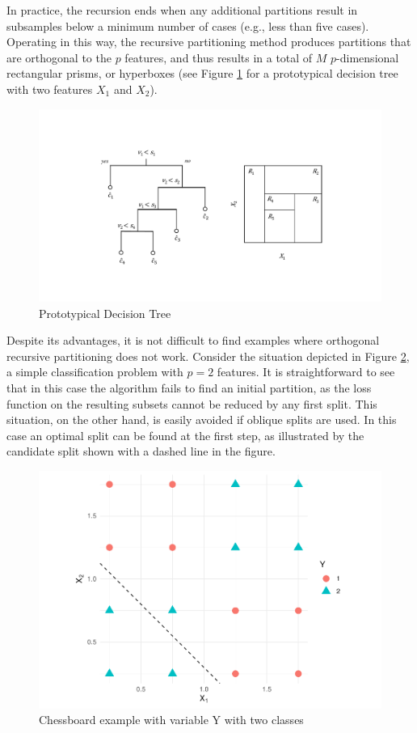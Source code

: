\documentclass[]{elsarticle} %
\makeatletter
\def\maxwidth{\ifdim\Gin@nat@width>\linewidth\linewidth
\else\Gin@nat@width\fi}
\let\Oldincludegraphics\includegraphics
\renewcommand{\includegraphics}[1]{\Oldincludegraphics[width=\maxwidth]{#1}}
\makeatother
\begin{document}
In practice, the recursion ends when any additional partitions result in
subsamples below a minimum number of cases (e.g., less than five cases).
Operating in this way, the recursive partitioning method produces
partitions that are orthogonal to the \(p\) features, and thus results
in a total of \(M\) \(p\)-dimensional rectangular prisms, or hyperboxes
(see Figure \ref{fig:fig1-example} for a prototypical decision tree with
two features \(X_1\) and \(X_2\)).

\begin{figure}[htbp]
\centering
\includegraphics{fig1-example.pdf}
\caption{\label{fig:fig1-example}Prototypical Decision Tree}
\end{figure}

Despite its advantages, it is not difficult to find examples where
orthogonal recursive partitioning does not work. Consider the situation
depicted in Figure \ref{fig:fig2-chessboard}, a simple classification
problem with \(p=2\) features. It is straightforward to see that in this
case the algorithm fails to find an initial partition, as the loss
function on the resulting subsets cannot be reduced by any first split.
This situation, on the other hand, is easily avoided if oblique splits
are used. In this case an optimal split can be found at the first step,
as illustrated by the candidate split shown with a dashed line in the
figure.

\begin{figure}[htbp]
\centering
\includegraphics{Trees_with_Base_Functions_v2_files/figure-latex/fig2-chessboard-1.pdf}
\caption{\label{fig:fig2-chessboard}Chessboard example with variable Y
with two classes}
\end{figure}
\end{document}
